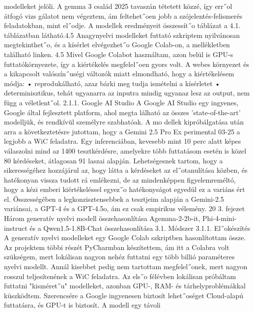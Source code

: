 \documentclass[12pt]{report}
\theoremstyle{definition}
\begin{document}
 modelleket jelöli. A gemma 3 család 2025 tavaszán tétetett közzé, így err˝ol átfogó vizs
gálatot nem végeztem, ám feltehet˝oen jobb a szójelentés-felismerés feladatokban, mint
 el˝odje. A modellek eredményeit összessít˝o táblázat a 4.1. táblázatban látható.4.5
 Anagynyelvi modelleket futtató szkriptem nyilvánosan megtekinthet˝o, és a kísérlet
 elvégezhet˝o Google Colab-on, a mellékletben található linken. 4.5
 Mivel Google Colabot használtam, azon belül is GPU-s futtatókörnyezete, így a
 kiértékelés megfelel˝oen gyors volt. A webes környezet és a kikapcsolt valószín˝uségi
 változók miatt elmondható, hogy a kiértékelésem módja:
 • reprodukálható, azaz bárki meg tudja ismételni a kísérletet
 • determinisztikus, tehát ugyanarra az inputra mindig ugyanaz lesz az output, nem
 függ a véletlent˝ol.
 2.1.1. Google AI Studio
 A Google AI Studio egy ingyenes, Google által fejlesztett platform, ahol megta
lálható az összes ’state-of-the-art’ modelljük, és rendkívül személyre szabhatóak. A mo
dellek kipróbálgatása után arra a következtetésre jutottam, hogy a Gemini 2.5 Pro Ex
perimental 03-25 a legjobb a WiC feladatra. Egy inferenciában, kevesebb mint 10 perc
 alatt képes válaszolni mind az 1400 tesztkérdésre, amelyekre több futtatásom esetén is
 közel 80%
 kérdéseket, átlagosan 91%
laszai alapján. Lehetségesnek tartom, hogy a sikerességéhez hozzájárul az, hogy látta
 a kérdéseket az el˝otanulítása közben, és hatékonyan vissza tudott rá emlékezni, de az
 mindenképpen figyelemreméltó, hogy a kézi emberi kiértékeléssel egyez˝o hatékonyságot
 egyedül ez a variáns ért el.
 Összességében a legkonzisztensebbek a tesztjeim alapján a Gemini-2.5 variánsai, a
 GPT-4 és a GPT-4.5o, ám ez csak empirikus vélemény.
 20
3. fejezet
 Három generatív nyelvi modell
 összehasonlítása
 Agemma-2-2b-it, Phi-4-mini-instruct és a
 Qwen1.5-1.8B-Chat összehasonlítása
 3.1. Módszer
 3.1.1. El˝okészítés
 A generatív nyelvi modelleket egy Google Colab szkriptben hasonlítottam össze.
 Az projektem többi részét PyCharmban készítettem, ám itt a Colabra volt szükségem,
 mert lokálisan nagyon nehéz futtatni egy több billió paraméteres nyelvi modellt. Annál
 kisebbet pedig nem tartottam megfelel˝onek, mert nagyon rosszul teljesítenének a WiC
 feladatra. Az els˝o félévben lokálisan próbáltam futtatni "kisméret˝u" modelleket, azonban
 GPU-, RAM- és tárhelyproblémákkal küszködtem. Szerencsére a Google ingyenesen
 biztosít lehet˝oséget Cloud-alapú futtatásra, és GPU-t is biztosít. A modell egy távoli
\end{document}
